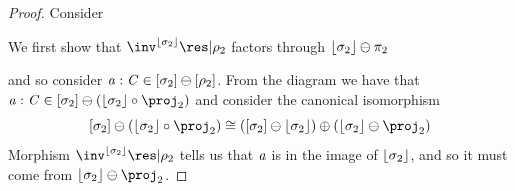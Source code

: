 \begin{proof}
    Consider
    \begin{center}
    \end{center}

    We first show that $\inv^{\concL{\sigma_2}}\res|{\rho_2}$ factors through $\lfloor\sigma_2\rfloor \ominus \pi_2$
    \begin{center}
    \end{center}
    and so consider $\mathit{a} : \mathit{C} \in [\sigma_2] \ominus [\rho_2]$.
    From the diagram we have that $\va : \vC \in \anyL{\sigma_2} \ominus (\concL{\sigma_2} \comp \proj_2)$
    and consider the canonical isomorphism 
    \[\anyL{\sigma_2} \ominus (\concL{\sigma_2} \comp \proj_2) \iso 
        (\anyL{\sigma_2} \ominus \concL{\sigma_2}) \mplus (\concL{\sigma_2} \ominus \proj_2) \]
    Morphism $\inv^{\concL{\sigma_2}}\res|{\rho_2}$ tells us that $\mathit{a}$ is in the image of $\lfloor\sigma_2\rfloor$, and so
    it must come from $\concL{\sigma_2} \ominus \proj_2$.


\end{proof}
